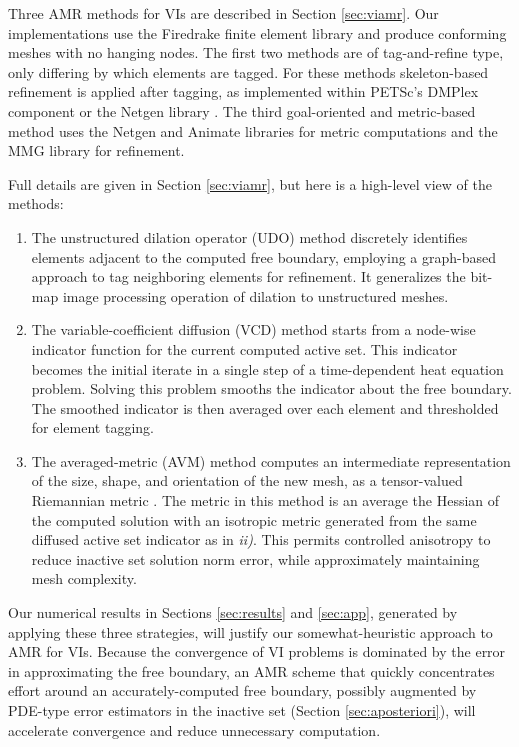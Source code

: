 \documentclass[]{interact}
\theoremstyle{plain}%
\theoremstyle{definition}
\theoremstyle{remark}
\begin{document}
Three AMR methods for VIs are described in Section \ref{sec:viamr}.  Our implementations use the Firedrake finite element library \cite{Rathgeberetal2016} and produce conforming meshes with no hanging nodes.  The first two methods are of tag-and-refine type, only differing by which elements are tagged.  For these methods skeleton-based refinement \cite{PlazaCarey2000} is applied after tagging, as implemented within PETSc's DMPlex component \cite{petsc-user-ref} or the Netgen library \cite{Betteridgeetal2024}.  The third goal-oriented and metric-based method uses the Netgen \cite{Wallworketal2020} and Animate libraries for metric computations and the MMG library \cite{DapognyDobrzynskiFrey2014} for refinement.

Full details are given in Section \ref{sec:viamr}, but here is a high-level view of the methods:

\renewcommand{\labelenumi}{\emph{\roman{enumi})}}
\begin{enumerate}
\item The unstructured dilation operator (UDO) method discretely identifies elements adjacent to the computed free boundary, employing a graph-based approach to tag neighboring elements for refinement.  It generalizes the bit-map image processing operation of dilation \cite{Pratt1991} to unstructured meshes.
\item The variable-coefficient diffusion (VCD) method starts from a node-wise indicator function for the current computed active set.  This indicator becomes the initial iterate in a single step of a time-dependent heat equation problem.  Solving this problem smooths the indicator about the free boundary.  The smoothed indicator is then averaged over each element and thresholded for element tagging.
\item The averaged-metric (AVM) method computes an intermediate representation of the size, shape, and orientation of the new mesh, as a tensor-valued Riemannian metric \cite{Alauzet2010}.  The metric in this method is an average the Hessian of the computed solution with an isotropic metric generated from the same diffused active set indicator as in \emph{ii)}.  This permits controlled anisotropy \cite{Wallworketal2020} to reduce inactive set solution norm error, while approximately maintaining mesh complexity.
\end{enumerate}

Our numerical results in Sections \ref{sec:results} and \ref{sec:app}, generated by applying these three strategies, will justify our somewhat-heuristic approach to AMR for VIs.  Because the convergence of VI problems is dominated by the error in approximating the free boundary, an AMR scheme that quickly concentrates effort around an accurately-computed free boundary, possibly augmented by PDE-type error estimators in the inactive set (Section \ref{sec:aposteriori}), will accelerate convergence and reduce unnecessary computation.
\end{document}
